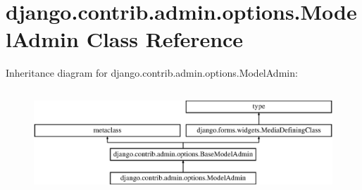\hypertarget{classdjango_1_1contrib_1_1admin_1_1options_1_1_model_admin}{}\section{django.\+contrib.\+admin.\+options.\+Model\+Admin Class Reference}
\label{classdjango_1_1contrib_1_1admin_1_1options_1_1_model_admin}
Inheritance diagram for django.\+contrib.\+admin.\+options.\+Model\+Admin\+:\begin{figure}[H]
\begin{center}
\leavevmode
\includegraphics[height=3.943662cm]{classdjango_1_1contrib_1_1admin_1_1options_1_1_model_admin}
\end{center}
\end{figure}
